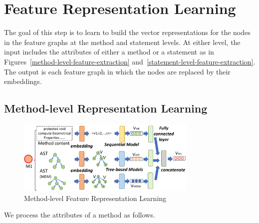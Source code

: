 \section{Feature Representation Learning}
\label{feature-learning:sec}

The goal of this step is to learn to build the vector representations
for the nodes in the feature graphs at the method and statement levels.
At either level, the input includes the attributes of either a method
or a statement as in Figures~\ref{method-level-feature-extraction}
and~\ref{statement-level-feature-extraction}. The output is each
feature graph in which the nodes are replaced by their embeddings.



\subsection{Method-level Representation Learning}

\begin{figure}[t]
	\centering
	\includegraphics[width=3.4in]{graphs/step-2-method-new.png}
	\caption{Method-level Feature Representation Learning}
	\label{method-level-feature-learning}
\end{figure}


We process the attributes of a method as follows.

